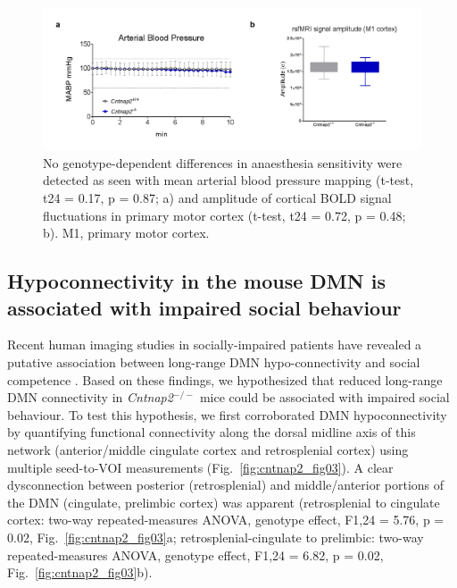 \begin{figure}[th] 
    \centering
    \includegraphics[scale=0.55]{figures/cntnap2_figure_s5.png}
    \decoRule
    \caption[No genotype-dependent differences in anaesthesia sensitivity in
    \textit{Cntnap2}$^{-/-}$ mice.]{No genotype-dependent differences in anaesthesia
    sensitivity were detected as seen with mean arterial blood pressure mapping
    (t-test, t24 = 0.17, p = 0.87; a) and amplitude of cortical BOLD signal
    fluctuations in primary motor cortex (t-test, t24 = 0.72, p = 0.48; b). M1,
    primary motor cortex.}
    \label{fig:cntnap2_figs5}
\end{figure}

\subsection{Hypoconnectivity in the mouse DMN is associated with impaired social
behaviour}

Recent human imaging studies in socially-impaired patients have revealed a
putative association between long-range DMN hypo-connectivity and social
competence \parencite{schreiner2014}. Based on these findings, we hypothesized
that reduced long-range DMN connectivity in \textit{Cntnap2}$^{-/-}$ mice could be associated
with impaired social behaviour. To test this hypothesis, we first corroborated
DMN hypoconnectivity by quantifying functional connectivity along the dorsal
midline axis of this network (anterior/middle cingulate cortex and
retrosplenial cortex) using multiple seed-to-VOI measurements
(Fig.~\ref{fig:cntnap2_fig03}). A clear dysconnection between posterior
(retrosplenial) and middle/anterior portions of the DMN (cingulate, prelimbic
cortex) was apparent (retrosplenial to cingulate cortex: two-way
repeated-measures ANOVA, genotype effect, F1,24 = 5.76, p = 0.02,
Fig.~\ref{fig:cntnap2_fig03}a; retrosplenial-cingulate to prelimbic: two-way
repeated-measures ANOVA, genotype effect, F1,24 = 6.82, p = 0.02,
Fig.~\ref{fig:cntnap2_fig03}b). 

